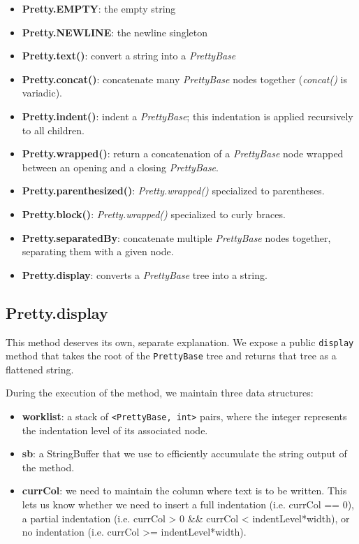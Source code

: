\documentclass[11pt]{article}
\begin{document}
\begin{itemize}
\item \textbf{Pretty.EMPTY}: the empty string
\item \textbf{Pretty.NEWLINE}: the newline singleton
\item \textbf{Pretty.text()}: convert a string into a \emph{PrettyBase}
\item \textbf{Pretty.concat()}: concatenate many \emph{PrettyBase} nodes together
  (\emph{concat()} is variadic).
\item \textbf{Pretty.indent()}: indent a \emph{PrettyBase}; this indentation is
  applied recursively to all children.
\item \textbf{Pretty.wrapped()}: return a concatenation of a \emph{PrettyBase} node
  wrapped between an opening and a closing \emph{PrettyBase}.
\item \textbf{Pretty.parenthesized()}: \emph{Pretty.wrapped()} specialized to
  parentheses.
\item \textbf{Pretty.block()}: \emph{Pretty.wrapped()} specialized to curly braces.
\item \textbf{Pretty.separatedBy}: concatenate multiple \emph{PrettyBase} nodes
  together, separating them with a given node.
\item \textbf{Pretty.display}: converts a \emph{PrettyBase} tree into a string.
\end{itemize}
\subsection{Pretty.display}
\label{sec-1-2}


This method deserves its own, separate explanation.  We expose a
public \texttt{display} method that takes the root of the \texttt{PrettyBase} tree
and returns that tree as a flattened string.

During the execution of the method, we maintain three data structures:

\begin{itemize}
\item \textbf{worklist}: a stack of \texttt{<PrettyBase, int>} pairs, where the integer
  represents the indentation level of its associated node.
\item \textbf{sb}: a StringBuffer that we use to efficiently accumulate the string
  output of the method.
\item \textbf{currCol}: we need to maintain the column where text is to be written.
  This lets us know whether we need to insert a full indentation
  (i.e. currCol == 0), a partial indentation (i.e. currCol > 0 &&
  currCol < indentLevel*width), or no indentation (i.e. currCol >=
  indentLevel*width).
\end{itemize}
\end{document}
